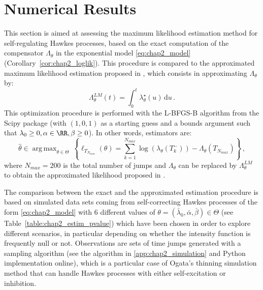 \section{Numerical Results}\label{sec:chap2_num_res}

This section is aimed at assessing the maximum likelihood estimation method for self-regulating Hawkes processes, based on the exact computation of the compensator \(\Lambda_\theta\) in the exponential model \eqref{eq:chap2_model} (Corollary~\ref{cor:chap2_loglik}).
This procedure is compared to the approximated maximum likelihood estimation proposed in \textcite{Lemonnier2014}, which consists in approximating $\Lambda_\theta$ by:
\[
  \Lambda_\theta^{LM}(t) = \int_{0}^{t}{\lambda_\theta^\star(u)\,\mathrm{d}u}\,.
\]
This optimization procedure is performed with the L-BFGS-B algorithm from the Scipy package (with $(1,0,1)$ as a starting guess and a bounds argument such that $\lambda_0 \geq 0, \alpha \in \RR, \beta\geq 0$).
In other words, estimators are:
\[
  \hat \theta \in \operatorname{arg\,max}_{\theta \in \Theta} ~
  \left\{ \ell_{T_{N_{max}}}(\theta)
  =
  \sum_{k=1}^{N_{max}}{\log{(\lambda_\theta(T_k^-))}} - \Lambda_\theta(T_{N_{max}}) \right\}\,,
\]
where
\(N_{max}=200\) is the total number of jumps
and \(\Lambda_\theta\) can be replaced by \(\Lambda_\theta^{LM}\) to obtain the approximated likelihood proposed in \textcite{Lemonnier2014}.

The comparison between the exact and the approximated estimation procedure is based on simulated data sets coming from self-correcting Hawkes processes of the form \eqref{eq:chap2_model} with 6 different values of \(\theta = (\bar \lambda_0, \bar \alpha, \bar \beta) \in \Theta\) (see Table~\ref{table:chap2_estim_pvalue}) which have been chosen in order to explore different scenarios, in particular depending on whether the intensity function is frequently null or not.
Observations are sets of time jumps generated with a sampling algorithm (see the algorithm in \ref{app:chap2_simulation} and Python implementation online), which is a particular case of Ogata's thinning simulation method \parencite{Ogata1981} that can handle Hawkes processes with either self-excitation or inhibition.

